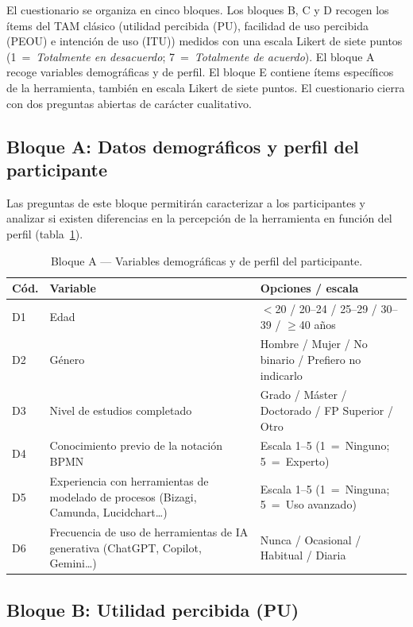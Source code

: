El cuestionario se organiza en cinco bloques. Los bloques B, C y D recogen los ítems del TAM clásico (utilidad percibida (PU), facilidad de uso percibida (PEOU) e intención de uso (ITU)) medidos con una escala Likert de siete puntos (1~=~\textit{Totalmente en desacuerdo}; 7~=~\textit{Totalmente de acuerdo}). El bloque A recoge variables demográficas y de perfil. El bloque E contiene ítems específicos de la herramienta, también en escala Likert de siete puntos. El cuestionario cierra con dos preguntas abiertas de carácter cualitativo.

\subsection{Bloque A: Datos demográficos y perfil del participante}
\label{subsec:bloqueA}

Las preguntas de este bloque permitirán caracterizar a los participantes y analizar si existen diferencias en la percepción de la herramienta en función del perfil (tabla~\ref{tab:demograficos}).

\begin{table}[htbp]
\centering
\caption{Bloque A --- Variables demográficas y de perfil del participante.}
\label{tab:demograficos}
\begin{tabular}{@{} p{0.65cm} p{5.4cm} p{6.5cm} @{}}
\hline
\rule{0pt}{10pt}\textbf{Cód.} & \textbf{Variable} & \textbf{Opciones / escala} \\
\hline
\rule{0pt}{10pt}D1 & Edad &
  $<$20 / 20--24 / 25--29 / 30--39 / $\geq$40 años \\[4pt]
D2 & Género &
  Hombre / Mujer / No binario / Prefiero no indicarlo \\[4pt]
D3 & Nivel de estudios completado &
  Grado / Máster / Doctorado / FP Superior / Otro \\[4pt]
D4 & Conocimiento previo de la notación BPMN &
  Escala 1--5 (1~=~Ninguno; 5~=~Experto) \\[4pt]
D5 & Experiencia con herramientas de modelado de procesos (Bizagi, Camunda, Lucidchart\ldots) &
  Escala 1--5 (1~=~Ninguna; 5~=~Uso avanzado) \\[4pt]
D6 & Frecuencia de uso de herramientas de IA generativa (ChatGPT, Copilot, Gemini\ldots) &
  Nunca / Ocasional / Habitual / Diaria \\[4pt]
\hline
\end{tabular}
\end{table}

\subsection{Bloque B: Utilidad percibida (PU)}
\label{subsec:bloqueB}

